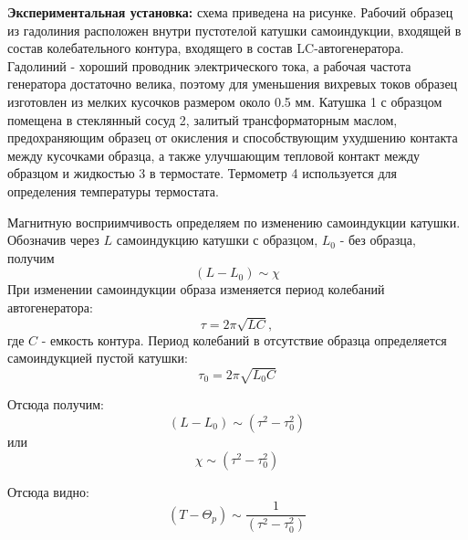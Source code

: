 \documentclass[14pt]{article}
\begin{document}
\vspace{1cm}
\textbf{Экспериментальная установка:} схема приведена на рисунке. Рабочий образец из гадолиния расположен внутри пустотелой катушки самоиндукции, входящей в состав колебательного контура, входящего в состав LC-автогенератора. Гадолиний - хороший проводник электрического тока, а рабочая частота генератора достаточно велика, поэтому для уменьшения вихревых токов образец изготовлен из мелких кусочков размером около 0.5 мм. Катушка 1 с образцом помещена в стеклянный сосуд 2, залитый трансформаторным маслом, предохраняющим образец от окисления и способствующим ухудшению контакта между кусочками образца, а также улучшающим тепловой контакт между образцом и жидкостью 3 в термостате. Термометр 4 используется для определения температуры термостата. 

Магнитную восприимчивость определяем по изменению самоиндукции катушки. Обозначив через $L$ самоиндукцию катушки с образцом, $L_0$ - без образца, получим 
$$
	(L - L_0) \sim \chi
$$
При изменении самоиндукции образа изменяется период колебаний автогенератора:
$$
	\tau = 2\pi\sqrt{LC},
$$
\noindent где $C$ - емкость контура. Период колебаний в отсутствие образца определяется самоиндукцией пустой катушки:
$$
	\tau_0 = 2\pi\sqrt{L_0C}
$$

Отсюда получим:
$$
	(L - L_0) \sim (\tau^2 - \tau_0^2)
$$
\noindent или
$$
	\chi \sim (\tau^2 - \tau_0^2)
$$

Отсюда видно:
$$
	(T - \Theta_p) \sim \frac{1}{(\tau^2 - \tau_0^2)}
$$
\end{document}
